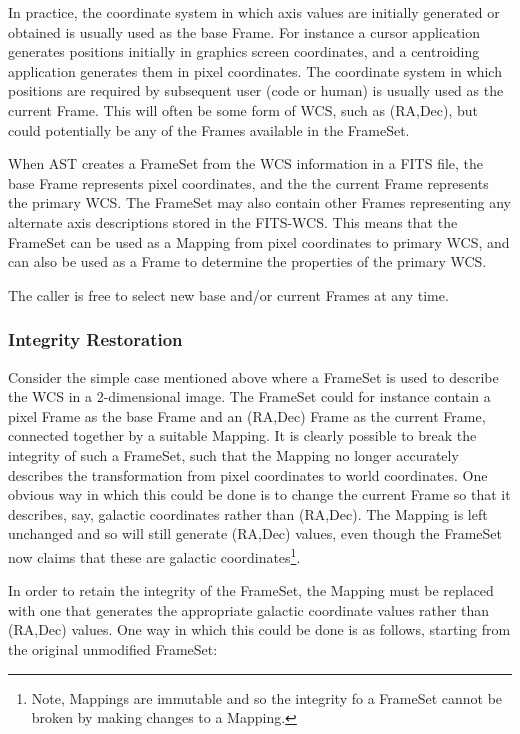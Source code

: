 \documentclass[final,authoryear,5p,times,twocolumn]{elsarticle}
\begin{document}
In practice, the coordinate system in which axis values are initially
generated or obtained is usually used as the base Frame. For instance a
cursor application generates positions initially in graphics screen
coordinates, and a centroiding application generates them in pixel
coordinates.  The coordinate system in which positions are required by
subsequent user (code or human) is usually used as the current Frame. This
will often be some form of WCS, such as (RA,Dec), but could potentially
be any of the Frames available in the FrameSet.

When AST creates a FrameSet from the WCS information in a FITS file, the
base Frame represents pixel coordinates, and the the current Frame
represents the primary WCS. The FrameSet may also contain other Frames
representing any alternate axis descriptions stored in the FITS-WCS.
This means that the FrameSet can be used as a Mapping from pixel
coordinates to primary WCS, and can also be used as a Frame to determine
the properties of the primary WCS.

The caller is free to select new base and/or current Frames at any time.

\subsubsection{Integrity Restoration}
\label{sec:integrity}
Consider the simple case mentioned above where a FrameSet is used to
describe the WCS in a 2-dimensional image. The FrameSet could for
instance contain a pixel Frame as the base Frame and an (RA,Dec) Frame as
the current Frame, connected together by a suitable Mapping. It is
clearly possible to break the integrity of such a FrameSet, such that the
Mapping no longer accurately describes the transformation from pixel
coordinates to world coordinates. One obvious way in which this could be
done is to change the current Frame so that it describes, say, galactic
coordinates rather than (RA,Dec). The Mapping is left unchanged and so will
still generate (RA,Dec) values, even though the FrameSet now claims that
these are galactic coordinates\footnote{Note, Mappings are immutable and so the
integrity fo a FrameSet cannot be broken by making changes to a Mapping.}.

In order to retain the integrity of the FrameSet, the Mapping must
be replaced with one that generates the appropriate galactic coordinate
values rather than (RA,Dec) values. One way in which this could be done is as
follows, starting from the original unmodified FrameSet:
\end{document}
